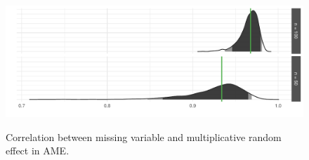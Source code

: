 \begin{figure}
	\centering
	\caption{Correlation between missing variable and multiplicative random effect in AME.}
	\label{fig:ameCorr}
	\includegraphics[width=1\textwidth]{ameSimCorr.pdf} \\
\end{figure}
